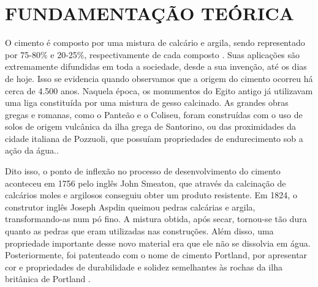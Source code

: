 \chapter{FUNDAMENTAÇÃO TEÓRICA}
\label{chap:fundamentacao-teorica}



O cimento é composto por uma mistura de calcário e argila, sendo representado por 75-80\% e 20-25\%, respectivamente de cada composto \cite{Andre2011}. Suas aplicações são extremamente difundidas em toda a sociedade, desde a sua invenção, até os dias de hoje. Isso se evidencia quando observamos que a origem do cimento ocorreu há cerca de 4.500 anos. Naquela época, os monumentos do Egito antigo já utilizavam uma liga constituída por uma mistura de gesso calcinado. As grandes obras gregas e romanas, como o Panteão e o Coliseu, foram construídas com o uso de solos de origem vulcânica da ilha grega de Santorino, ou das proximidades da cidade italiana de Pozzuoli, que possuíam propriedades de endurecimento sob a ação da água.\cite{ABCP}. 

 	\begin{figure}[h!] 
   	    \captionsetup{width=16cm}%
	\end{figure}

Dito isso, o ponto de inflexão no processo de desenvolvimento do cimento aconteceu em 1756 pelo inglês John Smeaton, que através da calcinação de calcários moles e argilosos conseguiu obter um produto resistente. Em 1824, o construtor inglês Joseph Aspdin queimou pedras calcárias e argila, transformando-as num pó fino. A mistura obtida, após secar, tornou-se tão dura quanto as pedras que eram utilizadas nas construções. Além disso, uma propriedade importante desse novo material era que ele não se dissolvia em água. Posteriormente, foi patenteado com o nome de cimento Portland, por apresentar cor e propriedades de durabilidade e solidez semelhantes às rochas da ilha britânica de Portland \cite{ABCP}.

